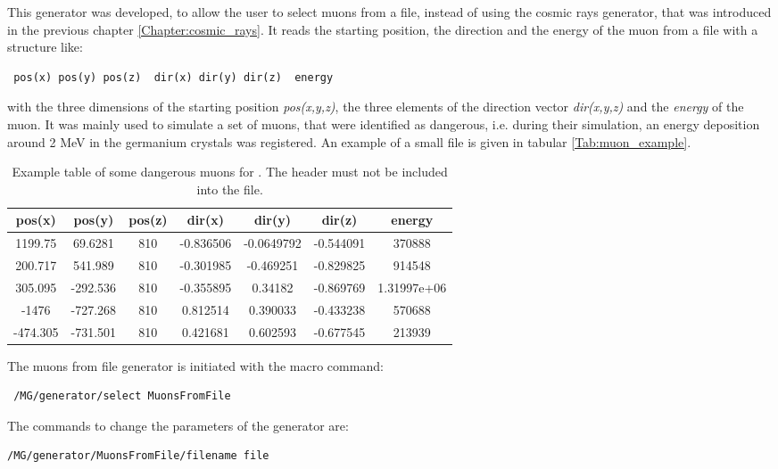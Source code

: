 This generator was developed, to allow the user to select muons from a file, instead 
of using the cosmic rays generator, that was introduced in the previous chapter \ref{Chapter:cosmic_rays}.
It reads the starting position, the direction and the energy of the muon from a file with a structure like:
\begin{lstlisting}
 pos(x) pos(y) pos(z)  dir(x) dir(y) dir(z)  energy
\end{lstlisting}
with the three dimensions of the starting position \textit{pos(x,y,z)}, the three elements of the direction
vector \textit{dir(x,y,z)} and the \textit{energy} of the muon. It was mainly used to simulate a set of muons, 
that were identified as dangerous, i.e. during their simulation, an energy deposition around 2 MeV in the germanium crystals
was registered. An example of a small file is given in tabular \ref{Tab:muon_example}.
\begin{table}[tp]
\caption{Example table of some dangerous muons for \mage. The header must not be included into the file.}
\label{Table:generators}
\begin{center}
\begin{tabular}{|c|c|c|c|c|c|c|}
\hline
 pos(x) & pos(y) &  pos(z) & dir(x) & dir(y) & dir(z) & energy \\ \hline \hline
1199.75 & 69.6281 & 810 & -0.836506 & -0.0649792 & -0.544091 & 370888 \\
200.717 & 541.989 & 810 & -0.301985 & -0.469251 & -0.829825 & 914548 \\
305.095 & -292.536 & 810 & -0.355895 & 0.34182 & -0.869769 & 1.31997e+06 \\
-1476 & -727.268 & 810 & 0.812514 & 0.390033 & -0.433238 & 570688 \\
-474.305 & -731.501 & 810 & 0.421681 & 0.602593 & -0.677545 & 213939 \\ \hline
\end{tabular}
\end{center}
\end{table}

The muons from file generator is initiated with the macro command:

\begin{lstlisting}
 /MG/generator/select MuonsFromFile
\end{lstlisting}

The commands to change the parameters of the generator are:
\begin{lstlisting}
/MG/generator/MuonsFromFile/filename file
\end{lstlisting}

